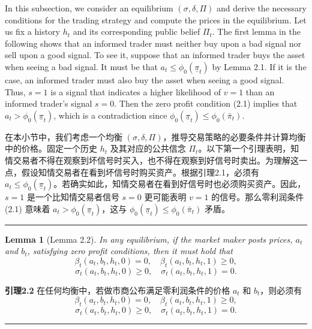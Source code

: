 \documentclass[12pt,a4paper]{article}
\newenvironment{original}{%
  \par\vspace{4pt}\noindent%
  \color{black}%
  \ignorespaces
}{%
  \par\vspace{2pt}%
}
\newenvironment{translation}{%
  \par\vspace{2pt}\noindent%
  \color{transblue}%
  \ignorespaces
}{%
  \par\vspace{4pt}\hrule\vspace{6pt}%
}
\newtheorem{lemma}[theorem]{Lemma}
\begin{document}
\begin{original}
In this subsection, we consider an equilibrium $(\sigma, \delta, \Pi)$ and derive the necessary conditions for the trading strategy and compute the prices in the equilibrium. Let us fix a history $h_t$ and its corresponding public belief $\Pi_t$. The first lemma in the following shows that an informed trader must neither buy upon a bad signal nor sell upon a good signal. To see it, suppose that an informed trader buys the asset when seeing a bad signal. It must be that $a_t \leq \phi_0(\underline{\pi}_t)$ by Lemma 2.1. If it is the case, an informed trader must also buy the asset when seeing a good signal. Thus, $s = 1$ is a signal that indicates a higher likelihood of $v = 1$ than an informed trader's signal $s = 0$. Then the zero profit condition (2.1) implies that $a_t > \phi_0(\underline{\pi}_t)$, which is a contradiction since $\phi_0(\underline{\pi}_t) \leq \phi_0(\bar{\pi}_t)$.
\end{original}
\begin{translation}
在本小节中，我们考虑一个均衡 $(\sigma, \delta, \Pi)$，推导交易策略的必要条件并计算均衡中的价格。固定一个历史 $h_t$ 及其对应的公共信念 $\Pi_t$。以下第一个引理表明，知情交易者不得在观察到坏信号时买入，也不得在观察到好信号时卖出。为理解这一点，假设知情交易者在看到坏信号时购买资产。根据引理2.1，必须有 $a_t \leq \phi_0(\underline{\pi}_t)$。若确实如此，知情交易者在看到好信号时也必须购买资产。因此，$s = 1$ 是一个比知情交易者信号 $s = 0$ 更可能表明 $v = 1$ 的信号。那么零利润条件 (2.1) 意味着 $a_t > \phi_0(\underline{\pi}_t)$，这与 $\phi_0(\underline{\pi}_t) \leq \phi_0(\bar{\pi}_t)$ 矛盾。
\end{translation}

\begin{lemma}[Lemma 2.2]
In any equilibrium, if the market maker posts prices, $a_t$ and $b_t$, satisfying zero profit conditions, then it must hold that
\[
\beta_t(a_t, b_t, h_t, 0) = 0, \quad \beta_t(a_t, b_t, h_t, 1) \geq 0,
\]
\[
\sigma_t(a_t, b_t, h_t, 0) \geq 0, \quad \sigma_t(a_t, b_t, h_t, 1) = 0.
\]
\end{lemma}
\begin{translation}
\textbf{引理2.2} 在任何均衡中，若做市商公布满足零利润条件的价格 $a_t$ 和 $b_t$，则必须有
\[
\beta_t(a_t, b_t, h_t, 0) = 0, \quad \beta_t(a_t, b_t, h_t, 1) \geq 0,
\]
\[
\sigma_t(a_t, b_t, h_t, 0) \geq 0, \quad \sigma_t(a_t, b_t, h_t, 1) = 0.
\]
\end{translation}
\end{document}
